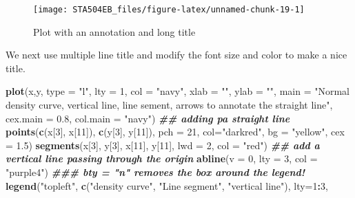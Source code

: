 \documentclass[
]{book}
\newenvironment{Shaded}{\begin{snugshade}}{\end{snugshade}}
\newcommand{\AttributeTok}[1]{\textcolor[rgb]{0.13,0.29,0.53}{#1}}
\newcommand{\DecValTok}[1]{\textcolor[rgb]{0.00,0.00,0.81}{#1}}
\newcommand{\DocumentationTok}[1]{\textcolor[rgb]{0.56,0.35,0.01}{\textbf{\textit{#1}}}}
\newcommand{\FloatTok}[1]{\textcolor[rgb]{0.00,0.00,0.81}{#1}}
\newcommand{\FunctionTok}[1]{\textcolor[rgb]{0.13,0.29,0.53}{\textbf{#1}}}
\newcommand{\NormalTok}[1]{#1}
\newcommand{\SpecialCharTok}[1]{\textcolor[rgb]{0.81,0.36,0.00}{\textbf{#1}}}
\newcommand{\StringTok}[1]{\textcolor[rgb]{0.31,0.60,0.02}{#1}}
\begin{document}
\begin{figure}

{\centering \texttt{[image: STA504EB\_files/figure-latex/unnamed-chunk-19-1]} 

}

\caption{Plot with an annotation and long title}\label{fig:unnamed-chunk-19}
\end{figure}

We next use multiple line title and modify the font size and color to make a nice title.

\begin{Shaded}
\begin{Highlighting}[]
\FunctionTok{plot}\NormalTok{(x,y, }\AttributeTok{type =} \StringTok{"l"}\NormalTok{, }\AttributeTok{lty =} \DecValTok{1}\NormalTok{, }\AttributeTok{col =} \StringTok{"navy"}\NormalTok{, }\AttributeTok{xlab =} \StringTok{""}\NormalTok{, }\AttributeTok{ylab =} \StringTok{""}\NormalTok{,}
     \AttributeTok{main =} \StringTok{"Normal density curve, vertical line, line sement, }
\StringTok{             arrows to annotate the straight line"}\NormalTok{,}
     \AttributeTok{cex.main =} \FloatTok{0.8}\NormalTok{, }\AttributeTok{col.main =} \StringTok{"navy"}\NormalTok{)}
\DocumentationTok{\#\# adding pa straight line}
\FunctionTok{points}\NormalTok{(}\FunctionTok{c}\NormalTok{(x[}\DecValTok{3}\NormalTok{], x[}\DecValTok{11}\NormalTok{]), }\FunctionTok{c}\NormalTok{(y[}\DecValTok{3}\NormalTok{], y[}\DecValTok{11}\NormalTok{]), }\AttributeTok{pch =} \DecValTok{21}\NormalTok{, }\AttributeTok{col=}\StringTok{"darkred"}\NormalTok{, }\AttributeTok{bg =} \StringTok{"yellow"}\NormalTok{, }
       \AttributeTok{cex =} \FloatTok{1.5}\NormalTok{)}
\FunctionTok{segments}\NormalTok{(x[}\DecValTok{3}\NormalTok{], y[}\DecValTok{3}\NormalTok{], x[}\DecValTok{11}\NormalTok{], y[}\DecValTok{11}\NormalTok{], }\AttributeTok{lwd =} \DecValTok{2}\NormalTok{, }\AttributeTok{col =} \StringTok{"red"}\NormalTok{)}
\DocumentationTok{\#\# add a vertical line passing through the origin}
\FunctionTok{abline}\NormalTok{(}\AttributeTok{v =} \DecValTok{0}\NormalTok{, }\AttributeTok{lty =} \DecValTok{3}\NormalTok{, }\AttributeTok{col =} \StringTok{"purple4"}\NormalTok{)}
\DocumentationTok{\#\#\#  bty = "n" removes the box around the legend!}
\FunctionTok{legend}\NormalTok{(}\StringTok{"topleft"}\NormalTok{, }\FunctionTok{c}\NormalTok{(}\StringTok{"density curve"}\NormalTok{, }\StringTok{"Line segment"}\NormalTok{, }\StringTok{"vertical line"}\NormalTok{), }\AttributeTok{lty=}\DecValTok{1}\SpecialCharTok{:}\DecValTok{3}\NormalTok{, }

\end{Highlighting}
\end{Shaded}
\end{document}
